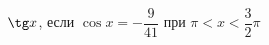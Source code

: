 \begin{ex}[type=calculate]
	\begin{condition}
		\( \tg x \), \quad если \( \cos x=-\dfrac{9}{41} \) при \( \pi<x<\dfrac{3}{2}\pi \)
	\end{condition}
\end{ex}